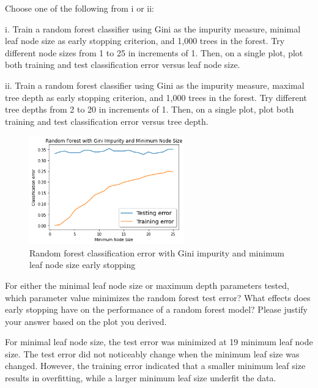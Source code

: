 \newpage

\problem[4] Choose one of the following from i or ii: \smallskip 

\noindent i. Train a random forest classifier using Gini as the impurity measure, minimal leaf node size as early stopping criterion, and 1,000 trees in the forest. Try different node sizes from 1 to 25 in increments of 1. Then, on a single plot, plot both training and test classification error versus
leaf node size.

ii. Train a random forest classifier using Gini as the impurity measure, maximal tree depth as early stopping criterion, and 1,000 trees in the forest. Try different tree depths from 2 to 20 in increments of 1. Then, on a single plot, plot both training and test classification error versus tree depth.

\begin{solution}
    \begin{figure}[H]
        \centering
        \includegraphics[width=0.6\textwidth]{plots/2c1.png}
        \caption{Random forest classification error with Gini impurity and minimum leaf node size early stopping}
        \label{fig:2c1}
    \end{figure}
\end{solution}

\problem[6]
For either the minimal leaf node size or maximum depth parameters tested, which parameter value minimizes the random forest test error? What effects does early stopping have on the performance of a random forest model?
Please justify your answer based on the plot you derived.

\begin{solution}
    For minimal leaf node size, the test error was minimized at 19 minimum leaf node size. The test error did not noticeably change when the minimum leaf size was changed. However, the training error indicated that a smaller minimum leaf size results in overfitting, while a larger minimum leaf size underfit the data.
\end{solution}

